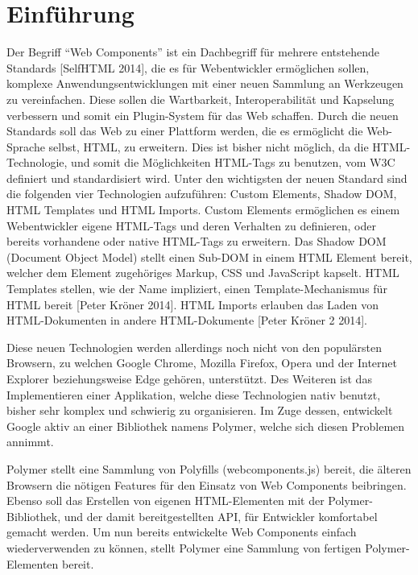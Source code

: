 \section{Einführung}\label{einfuxfchrung}

Der Begriff ``Web Components'' ist ein Dachbegriff für mehrere
entstehende Standards {[}SelfHTML 2014{]}, die es für Webentwickler
ermöglichen sollen, komplexe Anwendungsentwicklungen mit einer neuen
Sammlung an Werkzeugen zu vereinfachen. Diese sollen die Wartbarkeit,
Interoperabilität und Kapselung verbessern und somit ein Plugin-System
für das Web schaffen. Durch die neuen Standards soll das Web zu einer
Plattform werden, die es ermöglicht die Web-Sprache selbst, \ac{HTML},
zu erweitern. Dies ist bisher nicht möglich, da die HTML-Technologie,
und somit die Möglichkeiten HTML-Tags zu benutzen, vom \ac{W3C}
definiert und standardisiert wird. Unter den wichtigsten der neuen
Standard sind die folgenden vier Technologien aufzuführen: Custom
Elements, Shadow DOM, HTML Templates und HTML Imports. Custom Elements
ermöglichen es einem Webentwickler eigene HTML-Tags und deren Verhalten
zu definieren, oder bereits vorhandene oder native HTML-Tags zu
erweitern. Das Shadow DOM (Document Object Model) stellt einen Sub-DOM
in einem HTML Element bereit, welcher dem Element zugehöriges Markup,
CSS und JavaScript kapselt. HTML Templates stellen, wie der Name
impliziert, einen Template-Mechanismus für HTML bereit {[}Peter Kröner
2014{]}. HTML Imports erlauben das Laden von HTML-Dokumenten in andere
HTML-Dokumente {[}Peter Kröner 2 2014{]}.

Diese neuen Technologien werden allerdings noch nicht von den
populärsten Browsern, zu welchen Google Chrome, Mozilla Firefox, Opera
und der Internet Explorer beziehungsweise Edge gehören, unterstützt. Des
Weiteren ist das Implementieren einer Applikation, welche diese
Technologien nativ benutzt, bisher sehr komplex und schwierig zu
organisieren. Im Zuge dessen, entwickelt Google aktiv an einer
Bibliothek namens Polymer, welche sich diesen Problemen annimmt.

Polymer stellt eine Sammlung von Polyfills (webcomponents.js) bereit,
die älteren Browsern die nötigen Features für den Einsatz von Web
Components beibringen. Ebenso soll das Erstellen von eigenen
HTML-Elementen mit der Polymer-Bibliothek, und der damit
bereitgestellten API, für Entwickler komfortabel gemacht werden. Um nun
bereits entwickelte Web Components einfach wiederverwenden zu können,
stellt Polymer eine Sammlung von fertigen Polymer-Elementen bereit.

